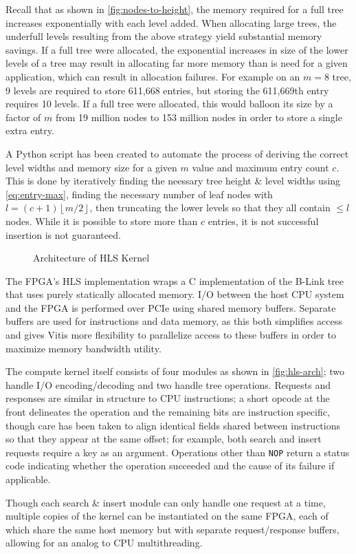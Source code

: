 Recall that as shown in \autoref{fig:nodes-to-height}, the memory required for a
full tree increases exponentially with each level added. When allocating large
trees, the underfull levels resulting from the above strategy yield substantial
memory savings. If a full tree were allocated, the exponential increases in size
of the lower levels of a tree may result in allocating far more memory than is
need for a given application, which can result in allocation failures.
%
For example on an $m=8$ tree, 9 levels are required to store 611,668 entries,
but storing the 611,669th entry requires 10 levels. If a full tree were
allocated, this would balloon its size by a factor of $m$ from 19 million nodes
to 153 million nodes in order to store a single extra entry.

A Python script has been created to automate the process of deriving the correct
level widths and memory size for a given $m$ value and maximum entry count $c$.
%
This is done by iteratively finding the neessary tree height \& level widths
using \autoref{eq:entry-max}, finding the necessary number of leaf nodes with
$l=(c+1)\left\lfloor{m/2}\right\rfloor$, then truncating the lower levels so
that they all contain $\leq l$ nodes.
%
While it is possible to store more than $c$ entries, it is not successful
insertion is not guaranteed.


\label{subsec:fpga-implementation}

\begin{figure}[H]
	\centering
	
	\caption{Architecture of HLS Kernel}
	\label{fig:hls-arch}
\end{figure}

The FPGA's HLS implementation wraps a C implementation of the B-Link tree that
uses purely statically allocated memory. I/O between the host CPU system and the
FPGA is performed over PCIe using shared memory buffers. Separate buffers are
used for instructions and data memory, as this both simplifies access and gives
Vitis more flexibility to parallelize access to these buffers in order to
maximize memory bandwidth utility.

The compute kernel itself consists of four modules as shown in
\autoref{fig:hls-arch}; two handle I/O encoding/decoding and two handle tree
operations. Requests and responses are similar in structure to CPU instructions;
a short opcode at the front delineates the operation and the remaining bits are
instruction specific, though care has been taken to align identical fields
shared between instructions so that they appear at the same offset; for example,
both search and insert requests require a key as an argument. Operations other
than \texttt{NOP} return a status code indicating whether the operation
succeeded and the cause of its failure if applicable.

Though each search \& insert module can only handle one request at a time,
multiple copies of the kernel can be instantiated on the same FPGA, each of
which share the same host memory but with separate request/response buffers,
allowing for an analog to CPU multithreading.
